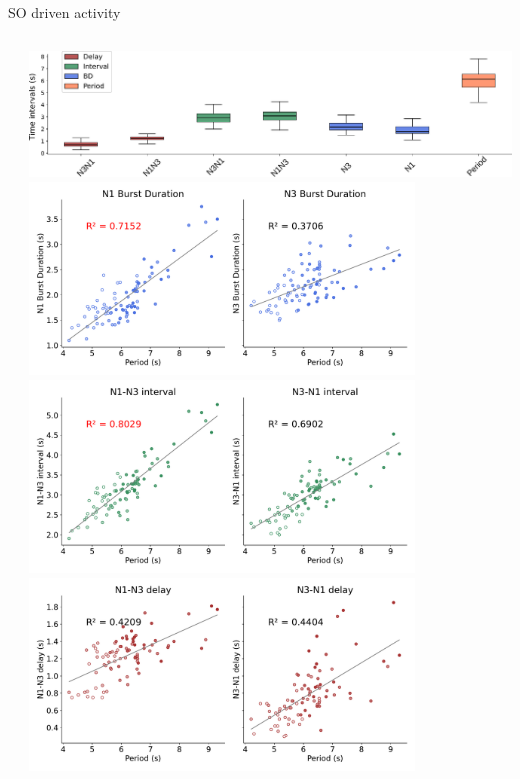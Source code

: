 \documentclass[aspectratio=43]{beamer}
\begin{document}
\begin{frame}{SO driven activity}
{\begin{columns}
\begin{column}{0.5\textwidth}
		\end{column}
		\begin{column}{0.5\textwidth}
			\includegraphics[width=\textwidth]{invariants/data/SUSSEX/prep4_so_driven_2/images/_boxplot_h_fitted.pdf}
			\centering
				\includegraphics[width=0.8\textwidth]{invariants/data/SUSSEX/prep4_so_driven_2/images/_durations.pdf}	\includegraphics[width=0.8\textwidth]{invariants/data/SUSSEX/prep4_so_driven_2/images/_intervals.pdf}	\includegraphics[width=0.8\textwidth]{invariants/data/SUSSEX/prep4_so_driven_2/images/_delays.pdf}	
			

\end{column}
\end{columns}}
\end{frame}
\end{document}
